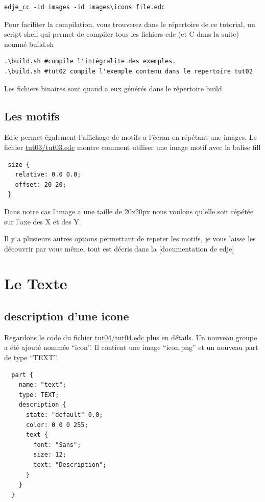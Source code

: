 \documentclass[a4paper]{efr}
\begin{document}
\begin{lstlisting}
edje_cc -id images -id images\icons file.edc
\end{lstlisting}

Pour faciliter la compilation, vous trouverez dans le répertoire de ce tutorial,
un script shell qui permet de compiler tous les fichiers edc (et C dans la
suite) nommé build.sh

\begin{lstlisting}
.\build.sh #compile l'intégralite des exemples.
.\build.sh #tut02 compile l'exemple contenu dans le repertoire tut02
\end{lstlisting}

Les fichiers binaires sont quand a eux générés dans le répertoire build.

\subsection{Les motifs}
Edje permet également l'affichage de motifs a l'écran en répétant une images.
Le fichier \href{file://tut03/tut03.edc}{tut03/tut03.edc} montre comment
utiliser une image motif avec la balise fill
\begin{lstlisting}
 size {
   relative: 0.0 0.0;
   offset: 20 20;
 }
\end{lstlisting}

Dans notre cas l'image a une taille de 20x20px nous voulons qu'elle soit répétée
sur l'axe des X et des Y.

Il y a plusieurs autres options permettant de repeter les motifs, je vous laisse
les découvrir par vous même, tout est décris dans la 
\href{http://docs.enlightenment.org/auto/edje/edcref.html}[documentation de edje]


\section{Le Texte}
\subsection{description d'une icone}
Regardons le code du fichier \href{file://tut04/tut04.edc}{tut04/tut04.edc} plus
en détails. Un nouveau groupe a été ajouté nommée ``icon''. Il contient une
image ``icon.png'' et un nouveau part de type ``TEXT''.

\begin{lstlisting}
  part {
    name: "text";
    type: TEXT;
    description {
      state: "default" 0.0;
      color: 0 0 0 255;
      text {
        font: "Sans";
        size: 12;
        text: "Description";
      }
    }
  }
\end{lstlisting}
\end{document}
